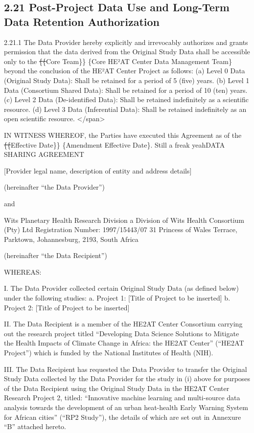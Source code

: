 \documentclass[12pt,letterpaper]{article}
\newcommand{\deleted}[1]{\textcolor{deletecolor}{\sout{#1}}}
\newcommand{\added}[1]{\textcolor{addcolor}{#1}}
\begin{document}
\subsection*{2.21 Post-Project Data Use and Long-Term Data Retention Authorization}

2.21.1 The Data Provider hereby explicitly and irrevocably authorizes and grants permission that the data derived from the Original Study Data shall be accessible only to the \deleted\{\deleted\{Core Team\}\} \added\{Core HE²AT Center Data Management Team\} beyond the conclusion of the HE²AT Center Project as follows: (a) Level 0 Data (Original Study Data): Shall be retained for a period of 5 (five) years. (b) Level 1 Data (Consortium Shared Data): Shall be retained for a period of 10 (ten) years. (c) Level 2 Data (De-identified Data): Shall be retained indefinitely as a scientific resource. (d) Level 3 Data (Inferential Data): Shall be retained indefinitely as an open scientific resource. </span>

IN WITNESS WHEREOF, the Parties have executed this Agreement as of the \deleted\{\deleted\{Effective Date\}\} \added\{Amendment Effective Date\}. Still a freak yeahDATA SHARING AGREEMENT

[Provider legal name, description of entity and address details]

 (hereinafter “the Data Provider”)

and

Wits Planetary Health Research Division a Division of Wits Health Consortium (Pty) Ltd Registration Number: 1997/15443/07 31 Princess of Wales Terrace, Parktown, Johannesburg, 2193, South Africa

(hereinafter “the Data Recipient”)

WHEREAS:

I.	The Data Provider collected certain Original Study Data (as defined below) under the following studies: a.	Project 1: [Title of Project to be inserted] b.	Project 2: [Title of Project to be inserted]

II.	The Data Recipient is a member of the HE2AT Center Consortium carrying out the research project titled “Developing Data Science Solutions to Mitigate the Health Impacts of Climate Change in Africa: the HE2AT Center” (“HE2AT Project”) which is funded by the National Institutes of Health (NIH).

III.	The Data Recipient has requested the Data Provider to transfer the Original Study Data collected by the Data Provider for the study in (i) above for purposes of the Data Recipient using the Original Study Data in the HE2AT Center Research Project 2, titled: “Innovative machine learning and multi-source data analysis towards the development of an urban heat-health Early Warning System for African cities” (“RP2 Study”), the details of which are set out in Annexure “B” attached hereto. 
\end{document}
